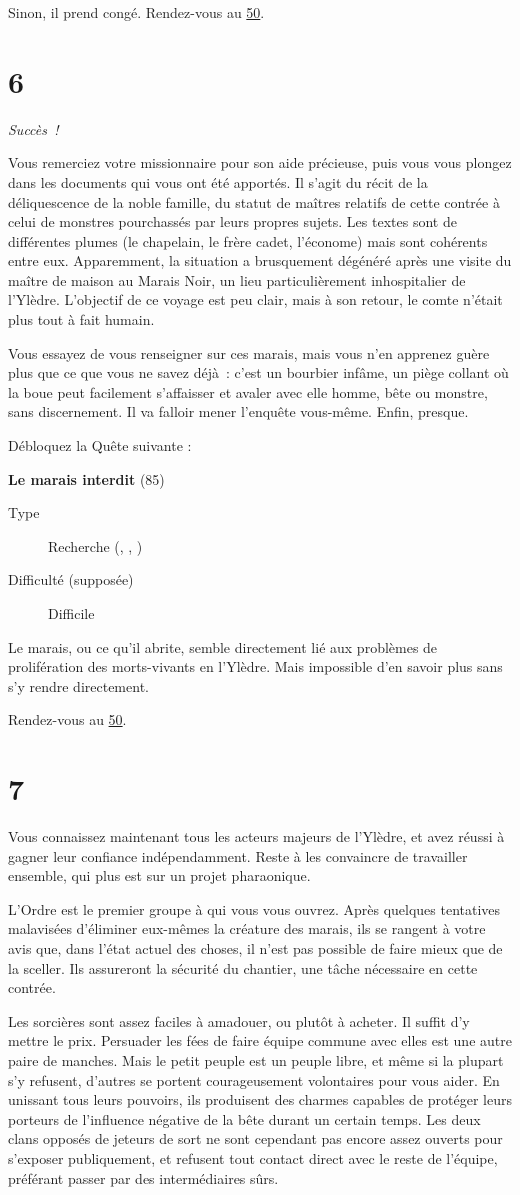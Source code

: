 \documentclass{report}
\newcommand{\gsection}[1]{
    \section{#1}
    \label{section-#1}
}
\newcommand{\glink}[1]{\hyperref[section-#1]{#1}}
\newcommand{\quest}[5]{
    \begin{mdframed}[innertopmargin=0.5cm,innerbottommargin=0.5cm,leftmargin=0.5cm,rightmargin=0.5cm]
        \begin{center}
            \textbf{#1} (#2)
        \end{center}
        \begin{description}
            \item[Type] #3
            \item[Difficulté (supposée)] #4
        \end{description}
        #5
    \end{mdframed}
}
\newcommand{\success}{\emph{Succès !}}
\begin{document}
Sinon, il prend congé. Rendez-vous au \glink{50}.

\gsection{6}

\success

Vous remerciez votre missionnaire pour son aide précieuse, puis vous vous plongez dans les documents qui vous ont été apportés. Il s'agit du récit de la déliquescence de la noble famille, du statut de maîtres relatifs de cette contrée à celui de monstres pourchassés par leurs propres sujets. Les textes sont de différentes plumes (le chapelain, le frère cadet, l'économe) mais sont cohérents entre eux. Apparemment, la situation a brusquement dégénéré après une visite du maître de maison au Marais Noir, un lieu particulièrement inhospitalier de l'Ylèdre. L'objectif de ce voyage est peu clair, mais à son retour, le comte n'était plus tout à fait humain.

Vous essayez de vous renseigner sur ces marais, mais vous n'en apprenez guère plus que ce que vous ne savez déjà : c'est un bourbier infâme, un piège collant où la boue peut facilement s'affaisser et avaler avec elle homme, bête ou monstre, sans discernement. Il va falloir mener l'enquête vous-même. Enfin, presque.

Débloquez la Quête suivante :

\quest{Le marais interdit}{85}{Recherche (\ankh, \caduceus, \cross)}{Difficile}{
Le marais, ou ce qu'il abrite, semble directement lié aux problèmes de prolifération des morts-vivants en l'Ylèdre. Mais impossible d'en savoir plus sans s'y rendre directement.
}

Rendez-vous au \glink{50}.

\gsection{7}

Vous connaissez maintenant tous les acteurs majeurs de l'Ylèdre, et avez réussi à gagner leur confiance indépendamment. Reste à les convaincre de travailler ensemble, qui plus est sur un projet pharaonique.

L'Ordre est le premier groupe à qui vous vous ouvrez. Après quelques tentatives malavisées d'éliminer eux-mêmes la créature des marais, ils se rangent à votre avis que, dans l'état actuel des choses, il n'est pas possible de faire mieux que de la sceller. Ils assureront la sécurité du chantier, une tâche nécessaire en cette contrée.

Les sorcières sont assez faciles à amadouer, ou plutôt à acheter. Il suffit d'y mettre le prix. Persuader les fées de faire équipe commune avec elles est une autre paire de manches. Mais le petit peuple est un peuple libre, et même si la plupart s'y refusent, d'autres se portent courageusement volontaires pour vous aider. En unissant tous leurs pouvoirs, ils produisent des charmes capables de protéger leurs porteurs de l'influence négative de la bête durant un certain temps. Les deux clans opposés de jeteurs de sort ne sont cependant pas encore assez ouverts pour s'exposer publiquement, et refusent tout contact direct avec le reste de l'équipe, préférant passer par des intermédiaires sûrs.
\end{document}
